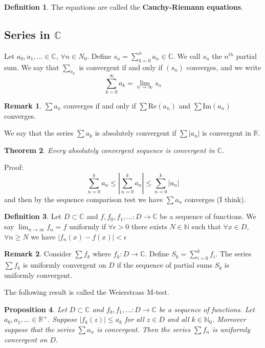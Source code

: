 \documentclass[11pt]{article}
\theoremstyle{plain}
\newtheorem{theorem}{Theorem}[section]
\newtheorem{proposition}[theorem]{Proposition}
\theoremstyle{definition}
\newtheorem{definition}[theorem]{Definition}
\newtheorem{remark}{Remark}
\begin{document}
\begin{definition}
The equations are called the \textbf{Cauchy-Riemann equations}.
\end{definition}

\subsection{Series in $\mathbb{C}$}
Let $a_0, a_1, ... \in \mathbb{C}$, $\forall n \in N_0$. Define $s_n = \sum_{k=0}^{n} a_n \in \mathbb{C}$. We call $s_n$ the $n^{th}$ partial sum. We say that $\sum_{a_k}$ is convergent if and only if $(s_n)$ converges, and we write
$$ \sum_{k=0}^{\infty} a_k = \lim_{n \to \infty}s_n $$

\begin{remark}
$\sum a_n$ converges if and only if $\sum \text{Re}(a_n)$ and $\sum\text{Im}(a_n)$ converges.
\end{remark}

We say that the series $\sum a_k$ is absolutely convergent if $\sum |a_n|$ is convergent in $\mathbb{R}$.

\begin{theorem}
Every absolutely convergent sequence is convergent in $\mathbb{C}$.
\end{theorem}

Proof: 
$$ \sum_{n = 0}^{k} a_n \leq \left| \sum_{n=0}^{k} a_n\right| \leq \sum_{n = 0}^{k} |a_n|$$
and then by the sequence comparison test we have $\sum a_n$ converges (I think).

\begin{definition}
Let $D \subset \mathbb{C}$ and $f, f_0, f_1, ... : D \to \mathbb{C}$ be a sequence of functions. We say $\lim_{n \to \infty} f_n = f$ uniformly if $\forall \epsilon > 0$ there exists $N \in \mathbb{N}$ such that $\forall x \in D$, $\forall n \geq N$ we have $|f_n(x) - f(x)| < \epsilon $
\end{definition}

\begin{remark}
Consider $\sum f_k$ where $f_k : D \to \mathbb{C}$. Define $S_k = \sum_{i = 0}^{k} f_i$. The series $\sum f_{k}$ is uniformly convergent on $D$ if the sequence of partial sums $S_k$ is uniformly convergent.
\end{remark}

The following result is called the Weierstrass M-test.

\begin{proposition}
Let $D \subset \mathbb{C}$ and $f_0, f_1, ... : D \to \mathbb{C}$ be a sequence of functions. Let $a_0, a_1, ... \in \mathbb{R}^{+}$. Suppose $|f_k(z)| \leq a_k$ for all $z\in D$ and all $k \in \mathbb{N}_{0}$. Moreover suppose that the series $\sum a_n$ is convergent. Then the series $\sum f_n$ is uniformly convergent on $D$.
\end{proposition}
\end{document}
